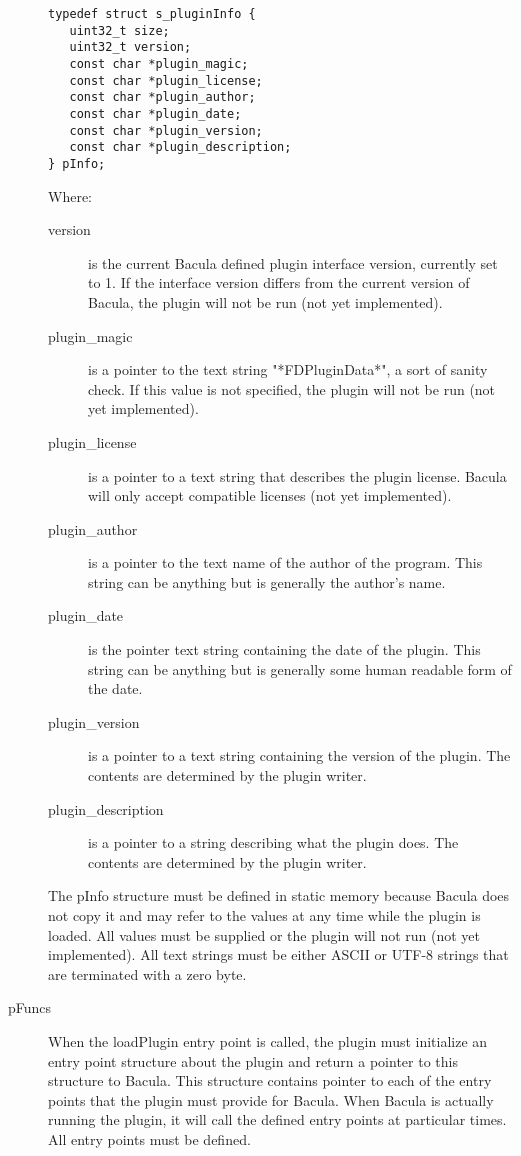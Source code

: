 \begin{description}
\begin{verbatim}
typedef struct s_pluginInfo {
   uint32_t size;
   uint32_t version;
   const char *plugin_magic;
   const char *plugin_license;
   const char *plugin_author;
   const char *plugin_date;
   const char *plugin_version;
   const char *plugin_description;
} pInfo;
\end{verbatim}

Where:
 \begin{description}
 \item [version] is the current Bacula defined plugin interface version, currently
   set to 1. If the interface version differs from the current version of
   Bacula, the plugin will not be run (not yet implemented).
 \item [plugin\_magic] is a pointer to the text string "*FDPluginData*", a
   sort of sanity check.  If this value is not specified, the plugin
   will not be run (not yet implemented).
 \item [plugin\_license] is a pointer to a text string that describes the
   plugin license. Bacula will only accept compatible licenses (not yet
   implemented).
 \item [plugin\_author] is a pointer to the text name of the author of the program.
   This string can be anything but is generally the author's name.
 \item [plugin\_date] is the pointer text string containing the date of the plugin.
   This string can be anything but is generally some human readable form of
   the date.
 \item [plugin\_version] is a pointer to a text string containing the version of
   the plugin.  The contents are determined by the plugin writer.
 \item [plugin\_description] is a pointer to a string describing what the
   plugin does. The contents are determined by the plugin writer.
 \end{description}

The pInfo structure must be defined in static memory because Bacula does not
copy it and may refer to the values at any time while the plugin is
loaded. All values must be supplied or the plugin will not run (not yet
implemented).  All text strings must be either ASCII or UTF-8 strings that
are terminated with a zero byte.

\item [pFuncs]
When the loadPlugin entry point is called, the plugin must initialize
an entry point structure about the plugin and return a pointer to
this structure to Bacula. This structure contains pointer to each
of the entry points that the plugin must provide for Bacula. When
Bacula is actually running the plugin, it will call the defined
entry points at particular times.  All entry points must be defined.


\end{description}

